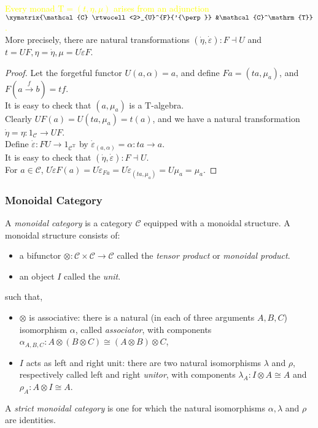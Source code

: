 \documentclass[UTF8,aspectratio=43,11pt,colorlinks,compress,openany]{beamer}%
\begin{document}
\begin{frame}\frametitle{}
\begin{theorem}
\textcolor{yellow}{Every monad $\mathrm{T}=(t,\eta,\mu)$ arises from an adjunction $\xymatrix{\mathcal{C} \rtwocell<2>_{U}^{F}{'{\perp}} &\mathcal{C}^\mathrm{T}}$.}\\
More precisely, there are natural transformations $(\dot{\eta},\dot{\varepsilon}): F\dashv U$ and $t=UF, \eta=\dot{\eta}, \mu=U\dot{\varepsilon} F$.
\end{theorem}
\begin{proof}
Let the forgetful functor $U(a,\alpha)=a$, and define $Fa=(ta,\mu_a)$, and $F(a\xrightarrow{f} b)=tf$.\\
It is easy to check that $(a,\mu_a)$ is a $\mathrm{T}$-algebra.\\
Clearly $UF(a)=U(ta,\mu_a)=t(a)$, and we have a natural transformation $\dot{\eta}=\eta: 1_\mathcal{C}\to UF$.\\
Define $\dot{\varepsilon}: FU\to 1_{\mathcal{C}^\mathrm{T}}$ by $\dot{\varepsilon}_{(a,\alpha)}=\alpha: ta\to a$.\\
It is easy to check that $(\dot{\eta},\dot{\varepsilon}): F\dashv U$.\\
For $a\in\mathcal{C}$,
$U\dot{\varepsilon} F(a)=U\dot{\varepsilon}_{Fa}=U\dot{\varepsilon}_{(ta,\mu_a)}=U\mu_a=\mu_a$.
\end{proof}
\end{frame}

\begin{frame}\frametitle{Monoidal Category}
\begin{definition}
A \emph{monoidal category} is a category $\mathcal{C}$ equipped with a monoidal structure. A monoidal structure consists of:
\begin{itemize}
	\item a bifunctor $\otimes:\mathcal{C}\times\mathcal{C}\to\mathcal{C}$ called the \emph{tensor product} or \emph{monoidal product}.
	\item an object $I$ called the \emph{unit}.
\end{itemize} such that,
\begin{itemize}
	\item $\otimes$ is associative: there is a natural (in each of three arguments $A,B,C$) isomorphism $\alpha$, called \emph{associator}, with components $\alpha_{A,B,C}: A\otimes (B\otimes C)\cong (A\otimes B)\otimes C$,
	\item $I$ acts as left and right unit: there are two natural isomorphisms $\lambda$ and $\rho$, respectively called left and right \emph{unitor}, with components $\lambda_A: I\otimes A\cong A$ and $\rho_A: A\otimes I\cong A$.
\end{itemize}
\end{definition}
A \emph{strict monoidal category} is one for which the natural isomorphisms $\alpha,\lambda$ and $\rho$ are identities.
\end{frame}
\end{document}
